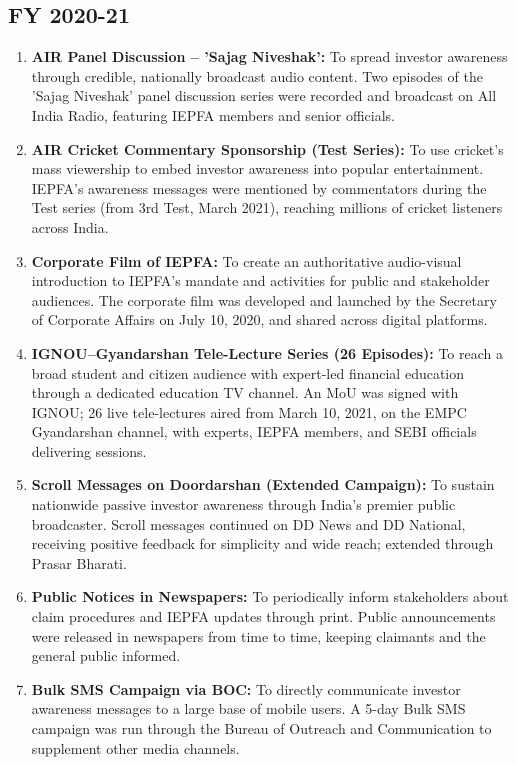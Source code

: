 \documentclass[openany]{book}
\begin{document}
\subsection{FY 2020-21}
\begin{enumerate}
    \item \textbf{AIR Panel Discussion – 'Sajag Niveshak':} To spread investor awareness through credible, nationally broadcast audio content. Two episodes of the 'Sajag Niveshak' panel discussion series were recorded and broadcast on All India Radio, featuring IEPFA members and senior officials.
    \item \textbf{AIR Cricket Commentary Sponsorship (Test Series):} To use cricket's mass viewership to embed investor awareness into popular entertainment. IEPFA's awareness messages were mentioned by commentators during the Test series (from 3rd Test, March 2021), reaching millions of cricket listeners across India.
    \item \textbf{Corporate Film of IEPFA:} To create an authoritative audio-visual introduction to IEPFA's mandate and activities for public and stakeholder audiences. The corporate film was developed and launched by the Secretary of Corporate Affairs on July 10, 2020, and shared across digital platforms.
    \item \textbf{IGNOU–Gyandarshan Tele-Lecture Series (26 Episodes):} To reach a broad student and citizen audience with expert-led financial education through a dedicated education TV channel. An MoU was signed with IGNOU; 26 live tele-lectures aired from March 10, 2021, on the EMPC Gyandarshan channel, with experts, IEPFA members, and SEBI officials delivering sessions.
    \item \textbf{Scroll Messages on Doordarshan (Extended Campaign):} To sustain nationwide passive investor awareness through India's premier public broadcaster. Scroll messages continued on DD News and DD National, receiving positive feedback for simplicity and wide reach; extended through Prasar Bharati.
    \item \textbf{Public Notices in Newspapers:} To periodically inform stakeholders about claim procedures and IEPFA updates through print. Public announcements were released in newspapers from time to time, keeping claimants and the general public informed.
    \item \textbf{Bulk SMS Campaign via BOC:} To directly communicate investor awareness messages to a large base of mobile users. A 5-day Bulk SMS campaign was run through the Bureau of Outreach and Communication to supplement other media channels.
\end{enumerate}
\end{document}
